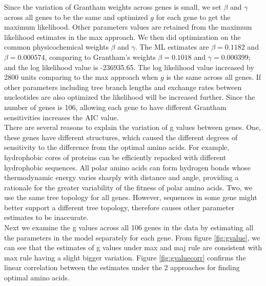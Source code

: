 \documentclass[13pt]{article}
\begin{document}
Since the variation of Grantham weights across genes is small, we set $\beta$ and $\gamma$ across all genes to be the same and optimized $g$ for each gene to get the maximum likelihood. 
Other parameters values are retained from the maximum likelihood estimates in the max approach.
We then did optimization on the common physicochemical weights $\beta$ and $\gamma$.
The ML estimates are $\beta = 0.1182$ and $\beta = 0.000574$, comparing to Grantham's weights $\beta = 0.1018$ and $\gamma = 0.000399$; and the log likelihood value is -236935.65. 
The log likelihood value increased by 2800 units comparing to the max approach when $g$ is the same across all genes. 
If other parameters including tree branch lengths and exchange rates between nucleotides are also optimized the likelihood will be increased further.
Since the number of genes is 106, allowing each gene to have different Grantham sensitivities increases the AIC value. \\

There are several reasons to explain the variation of g values between genes. 
One, these genes have different structures, which caused the different degrees of sensitivity to the difference from the optimal amino acids. 
For example, hydrophobic cores of proteins can be efficiently repacked with different hydrophobic sequences. All polar amino acids can form hydrogen bonds whose thermodynamic energy varies sharply with distance and angle, providing a rationale for the greater variability of the fitness of polar amino acids.
Two, we use the same tree topology for all genes. However, sequences in some gene might better support a different  tree topology, therefore causes other parameter estimates to be inaccurate.\\

Next we examine the g values across all 106 genes in the data by estimating all the parameters in the model separately for each gene. 
From figure \ref{fig:gvalue}, we can see that the estimates of g values under max and maj rule are consistent with max rule having a slight bigger variation. 
Figure \ref{fig:gvaluecorr} confirms the linear correlation between the estimates under the 2 approaches for finding optimal amino acids. 
\end{document}
